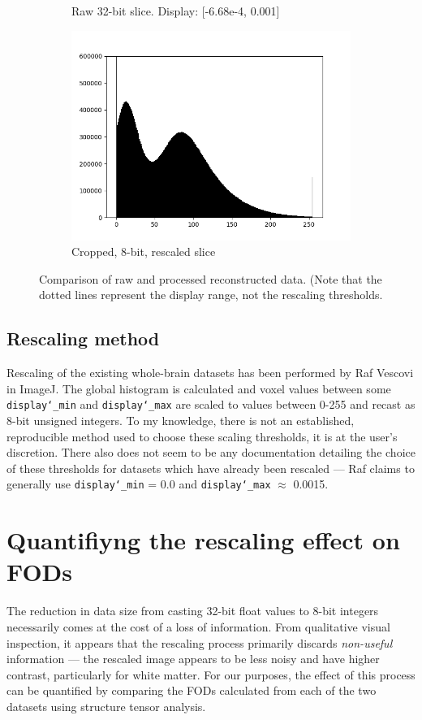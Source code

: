 \documentclass[11pt]{article}
\begin{document}
\begin{figure}[h]
\begin{subfigure}[b]{0.48\textwidth}
    \caption{Raw 32-bit slice. Display: [-6.68e-4, 0.001]}
  \end{subfigure}
  \hspace{1em}
  \begin{subfigure}[b]{0.48\textwidth}
    \centering
    \includegraphics[width=0.9\linewidth]{figs/recon_crop8_hist}
    \caption{Cropped, 8-bit, rescaled slice}
  \end{subfigure}
  \caption{Comparison of raw and processed reconstructed data. (Note that the
    dotted lines represent the display range, not the rescaling thresholds.}
  \label{fig:datacomp}
\end{figure}

\subsection{Rescaling method}
Rescaling of the existing whole-brain datasets has been performed by Raf Vescovi
in ImageJ.  The global histogram is calculated and voxel values between some
\texttt{display\char`_min} and \texttt{display\char`_max} are scaled to values
between 0-255 and recast as 8-bit unsigned integers. To my knowledge, there is
not an established, reproducible method used to choose these scaling thresholds,
it is at the user's discretion. There also does not seem to be any documentation
detailing the choice of these thresholds for datasets which have already been
rescaled --- Raf claims to generally use \texttt{display\char`_min} = 0.0 and
\texttt{display\char`_max} $\approx$ 0.0015.

\section{Quantifiyng the rescaling effect on FODs}
The reduction in data size from casting 32-bit float values to 8-bit integers
necessarily comes at the cost of a loss of information. From qualitative visual
inspection, it appears that the rescaling process primarily discards
\textit{non-useful} information --- the rescaled image appears to be less noisy
and have higher contrast, particularly for white matter. For our purposes, the
effect of this process can be quantified by comparing the FODs calculated from
each of the two datasets using structure tensor analysis.
\end{document}
